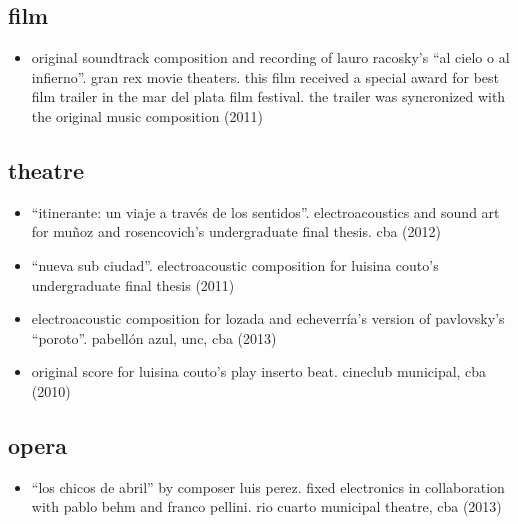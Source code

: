 \documentclass{book}
\begin{document}
\subsection{film}
\begin{itemize}
\item original soundtrack composition and recording of lauro racosky’s “al cielo o al infierno”. gran rex movie theaters. this film received a special award for best film trailer in the mar del plata film festival. the trailer was syncronized with the original music composition (2011)
\end{itemize}

\subsection{theatre}
\begin{itemize}
\item “itinerante: un viaje a través de los sentidos”. electroacoustics and sound art for muñoz and rosencovich’s undergraduate final thesis. cba (2012)
\item “nueva sub ciudad”. electroacoustic composition for luisina couto’s undergraduate final thesis (2011)
\item electroacoustic composition for lozada and echeverría’s version of pavlovsky’s “poroto”. pabellón azul, unc, cba (2013)
\item original score for luisina couto’s play inserto beat. cineclub municipal, cba (2010)
\end{itemize}
\subsection{opera}
\begin{itemize}
\item “los chicos de abril” by composer luis perez. fixed electronics in collaboration with pablo behm and franco pellini. rio cuarto municipal theatre, cba (2013)
\end{itemize}
\end{document}
